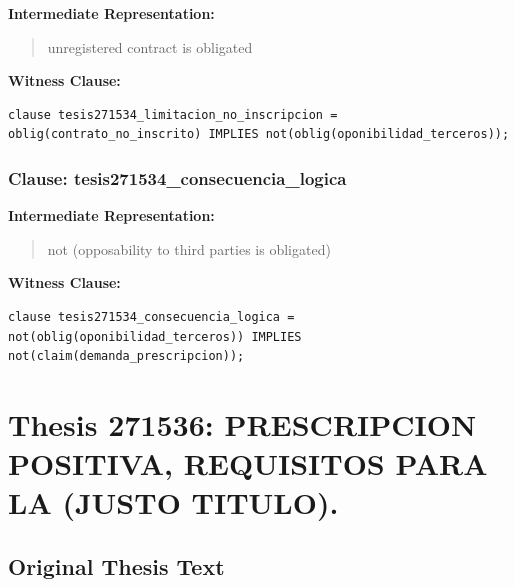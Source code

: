 \documentclass[11pt,a4paper]{article}
\begin{document}
\textbf{Intermediate Representation:}

\begin{quote}
unregistered contract is obligated
\end{quote}

\textbf{Witness Clause:}

\begin{lstlisting}[style=witnessstyle, language=Witness]
clause tesis271534_limitacion_no_inscripcion = oblig(contrato_no_inscrito) IMPLIES not(oblig(oponibilidad_terceros));
\end{lstlisting}

\subsubsection{Clause: tesis271534\_consecuencia\_logica}

\textbf{Intermediate Representation:}

\begin{quote}
not (opposability to third parties is obligated)
\end{quote}

\textbf{Witness Clause:}

\begin{lstlisting}[style=witnessstyle, language=Witness]
clause tesis271534_consecuencia_logica = not(oblig(oponibilidad_terceros)) IMPLIES not(claim(demanda_prescripcion));
\end{lstlisting}

\newpage

\section{Thesis 271536: PRESCRIPCION POSITIVA, REQUISITOS PARA LA (JUSTO TITULO).}
\label{thesis:271536}

\subsection{Original Thesis Text}
\end{document}
